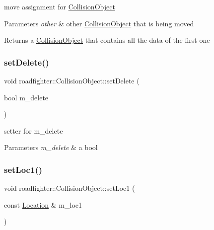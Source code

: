 move assignment for \hyperlink{classroadfighter_1_1CollisionObject}{Collision\+Object} 
\begin{DoxyParams}{Parameters}
{\em other} & other \hyperlink{classroadfighter_1_1CollisionObject}{Collision\+Object} that is being moved \\
\hline
\end{DoxyParams}
\begin{DoxyReturn}{Returns}
a \hyperlink{classroadfighter_1_1CollisionObject}{Collision\+Object} that contains all the data of the first one 
\end{DoxyReturn}
\mbox{\label{classroadfighter_1_1CollisionObject_a454547da963cd4d7e09f57bc64a0f984}} 
\subsubsection{\texorpdfstring{set\+Delete()}{setDelete()}}
{\footnotesize\ttfamily void roadfighter\+::\+Collision\+Object\+::set\+Delete (\begin{DoxyParamCaption}\item[{bool}]{m\+\_\+delete }\end{DoxyParamCaption})}

setter for m\+\_\+delete 
\begin{DoxyParams}{Parameters}
{\em m\+\_\+delete} & a bool \\
\hline
\end{DoxyParams}
\mbox{\label{classroadfighter_1_1CollisionObject_a3e0d924b453c9003a4992046fa3c52e1}} 
\subsubsection{\texorpdfstring{set\+Loc1()}{setLoc1()}}
{\footnotesize\ttfamily void roadfighter\+::\+Collision\+Object\+::set\+Loc1 (\begin{DoxyParamCaption}\item[{const \hyperlink{classroadfighter_1_1Location}{Location} \&}]{m\+\_\+loc1 }\end{DoxyParamCaption})}

